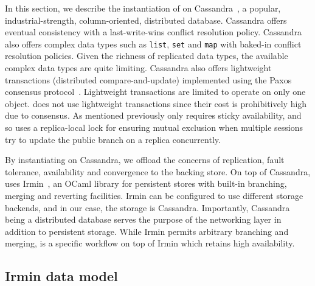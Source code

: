 In this section, we describe the instantiation of \name on
Cassandra~\cite{Cassandra}, a popular, industrial-strength, column-oriented,
distributed database. Cassandra offers eventual consistency with a
last-write-wins conflict resolution policy. Cassandra also offers complex data
types such as \texttt{list}, \texttt{set} and \texttt{map} with baked-in conflict resolution policies. Given the
richness of replicated data types, the available complex data types are quite
limiting. Cassandra also offers lightweight transactions (distributed
compare-and-update) implemented using the Paxos consensus
protocol~\cite{lamport2001paxos}. Lightweight transactions are limited to operate
on only one object. \name does not use lightweight transactions since their cost is prohibitively high due to consensus. As
mentioned previously \name only requires sticky availability, and so uses a
replica-local lock for ensuring mutual exclusion when multiple sessions try to
update the public branch on a replica concurrently.

By instantiating \name on Cassandra, we offload the concerns of replication,
fault tolerance, availability and convergence to the backing store. On top of
Cassandra, \name uses Irmin~\cite{Irmin}, an OCaml library for persistent
stores with built-in branching, merging and reverting facilities. Irmin can be
configured to use different storage backends, and in our case, the storage is
Cassandra. Importantly, Cassandra being a distributed database serves the
purpose of the networking layer in addition to persistent storage. While Irmin permits
arbitrary branching and merging, \name is a specific workflow on top of Irmin
which retains high availability.

\subsection{Irmin data model}

